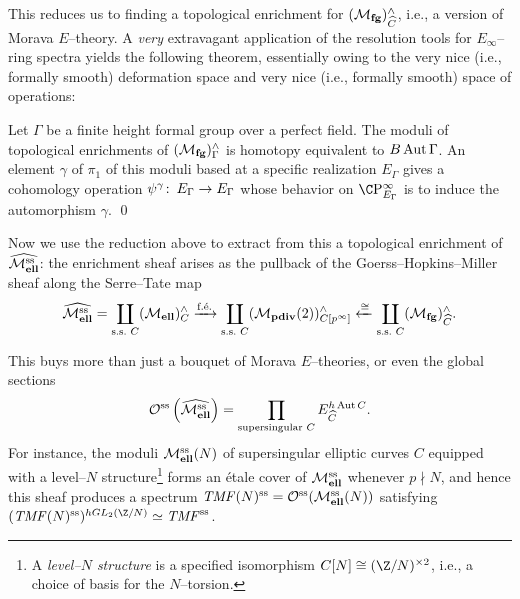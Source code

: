 This reduces us to finding a topological enrichment for $(\mathcal{M}_{\mathbf{fg}})^\wedge_{\widehat{C}}$, i.e., a version of Morava $E$--theory.  A \emph{very} extravagant application of the resolution tools for $E_\infty$--ring spectra yields the following theorem, essentially owing to the very nice (i.e., formally smooth) deformation space and very nice (i.e., formally smooth) space of operations:

\begin{theorem}\label{GHMTheoremForEThy}\label{obstruction theory}
Let $\Gamma$ be a finite height formal group over a perfect field.  The moduli of topological enrichments of $(\mathcal{M}_{\mathbf{fg}})^\wedge_\Gamma$ is homotopy equivalent to $B\operatorname{Aut} \Gamma$.  An element $\gamma$ of $\pi_1$ of this moduli based at a specific realization $E_\Gamma$ gives a cohomology operation $\psi^\gamma\colon\thinspace E_\Gamma \to E_\Gamma$ whose behavior on $\CP^\infty_{E_\Gamma}$ is to induce the automorphism $\gamma$. \qed
\end{theorem}

Now we use the reduction above to extract from this a topological enrichment of $\widehat{\mathcal{M}_{\mathbf{ell}}^{\mathrm{ss}}}$: the enrichment sheaf arises as the pullback of the Goerss--Hopkins--Miller sheaf along the Serre--Tate map \[\widehat{\mathcal{M}_{\mathbf{ell}}^{\mathrm{ss}}} = \coprod_{\text{s.s.\ $C$}} (\mathcal{M}_{\mathbf{ell}})^\wedge_C \xrightarrow{\text{f.\'e.}} \coprod_{\text{s.s.\ $C$}} (\mathcal{M}_{\mathbf{pdiv}}(2))^\wedge_{C[p^\infty]} \xleftarrow{\cong} \coprod_{\text{s.s.\ $C$}} (\mathcal{M}_{\mathbf{fg}})^\wedge_{\widehat C}.\]

\begin{remark}
This buys more than just a bouquet of Morava $E$--theories, or even the global sections \[\mathcal{O}^{\mathrm{ss}}\left(\widehat{\mathcal{M}_{\mathbf{ell}}^{\mathrm{ss}}}\right) = \prod_{\text{supersingular $C$}} E_{\widehat C}^{h\operatorname{Aut} C}.\]  For instance, the moduli $\mathcal{M}_{\mathbf{ell}}^{\mathrm{ss}}(N)$ of supersingular elliptic curves $C$ equipped with a level--$N$ structure\footnote{A \textit{level--$N$ structure} is a specified isomorphism $C[N] \cong (\Z/N)^{\times 2}$, i.e., a choice of basis for the $N$--torsion.} forms an \'etale cover of $\mathcal{M}_{\mathbf{ell}}^{\mathrm{ss}}$ whenever $p \nmid N$, and hence this sheaf produces a spectrum $\mathit{TMF}(N)^{\mathrm{ss}} = \mathcal{O}^{\mathrm{ss}}(\mathcal{M}_{\mathbf{ell}}^{\mathrm{ss}}(N))$ satisfying $(\TMF(N)^{\ss})^{hGL_2(\Z/N)} \simeq \TMF^{\ss}$.
\end{remark}







